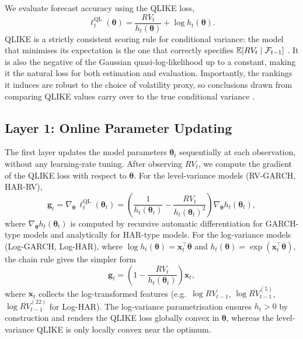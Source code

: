 We evaluate forecast accuracy using the QLIKE loss,
\begin{equation}\label{eq:qlike}
    \ell_t^{\mathrm{QL}}(\boldsymbol{\theta}) = \frac{RV_t}{h_t(\boldsymbol{\theta})} + \log h_t(\boldsymbol{\theta}).
\end{equation}
QLIKE is a strictly consistent scoring rule for conditional variance: the model that minimises its expectation is the one that correctly specifies $\mathbb{E}[RV_t \mid \mathcal{F}_{t-1}]$ \citep{patton2011data}. It is also the negative of the Gaussian quasi-log-likelihood up to a constant, making it the natural loss for both estimation and evaluation. Importantly, the rankings it induces are robust to the choice of volatility proxy, so conclusions drawn from comparing QLIKE values carry over to the true conditional variance \citep{patton2011data}.

\subsection{Layer 1: Online Parameter Updating}\label{sec:layer1}

The first layer updates the model parameters $\boldsymbol{\theta}_t$ sequentially at each observation, without any learning-rate tuning. After observing $RV_t$, we compute the gradient of the QLIKE loss with respect to $\boldsymbol{\theta}$. For the level-variance models (RV-GARCH, HAR-RV),
\begin{equation}\label{eq:gradient}
    \mathbf{g}_t = \nabla_{\boldsymbol{\theta}} \, \ell_t^{\mathrm{QL}}(\boldsymbol{\theta}_t) = \left( \frac{1}{h_t(\boldsymbol{\theta}_t)} - \frac{RV_t}{h_t(\boldsymbol{\theta}_t)^2} \right) \nabla_{\boldsymbol{\theta}} h_t(\boldsymbol{\theta}_t),
\end{equation}
where $\nabla_{\boldsymbol{\theta}} h_t(\boldsymbol{\theta}_t)$ is computed by recursive automatic differentiation for GARCH-type models and analytically for HAR-type models. For the log-variance models (Log-GARCH, Log-HAR), where $\log h_t(\boldsymbol{\theta}) = \mathbf{x}_t^\top \boldsymbol{\theta}$ and $h_t(\boldsymbol{\theta}) = \exp(\mathbf{x}_t^\top \boldsymbol{\theta})$, the chain rule gives the simpler form
\begin{equation}\label{eq:gradient_log}
    \mathbf{g}_t = \left(1 - \frac{RV_t}{h_t(\boldsymbol{\theta}_t)}\right) \mathbf{x}_t,
\end{equation}
where $\mathbf{x}_t$ collects the log-transformed features (e.g.\ $\log RV_{t-1}$, $\log \overline{RV}_{t-1}^{(5)}$, $\log \overline{RV}_{t-1}^{(22)}$ for Log-HAR). The log-variance parametrisation ensures $h_t > 0$ by construction and renders the QLIKE loss globally convex in $\boldsymbol{\theta}$, whereas the level-variance QLIKE is only locally convex near the optimum.

